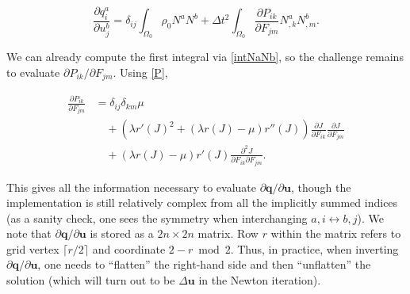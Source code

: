 \documentclass{article}
\begin{document}
\begin{equation} \label{dqaidubjii}
\frac{\partial q^a_i}{\partial u^b_j}
  = \delta_{ij} \int_{\Omega_0} \rho_0 N^a N^b
  + \Delta t^2 \int_{\Omega_0} \frac{\partial P_{ik}}{\partial F_{jm}} N^a_{,k} N^b_{,m}.
\end{equation}

We can already compute the first integral via \eqref{intNaNb}, so the challenge remains to evaluate \(\partial P_{ik} / \partial F_{jm}\).  Using \eqref{P},

\begin{equation}
\begin{split}
\frac{\partial P_{ik}}{\partial F_{jm}}
  & = \delta_{ij} \delta_{km} \mu \\
  & \quad + \left( \lambda r'(J)^2 + \left( \lambda r(J) - \mu \right) r''(J) \right) \frac{\partial J}{\partial F_{ik}} \frac{\partial J}{\partial F_{jm}} \\
  & \quad + \left( \lambda r(J) - \mu \right) r'(J) \frac{\partial^2 J}{\partial F_{ik} \partial F_{jm}}.
\end{split}
\end{equation}

This gives all the information necessary to evaluate \(\partial \mathbf{q} / \partial \mathbf{u}\), though the implementation is still relatively complex from all the implicitly summed indices (as a sanity check, one sees the symmetry when interchanging \(a,i \leftrightarrow b,j\)).  We note that \(\partial \mathbf{q} / \partial \mathbf{u}\) is stored as a \(2n \times 2n\) matrix.  Row \(r\) within the matrix refers to grid vertex \(\lceil r/2 \rceil\) and coordinate \(2 - r \bmod 2\).  Thus, in practice, when inverting \(\partial \mathbf{q} / \partial \mathbf{u}\), one needs to ``flatten'' the right-hand side and then ``unflatten'' the solution (which will turn out to be \(\Delta \mathbf{u}\) in the Newton iteration).
\end{document}
